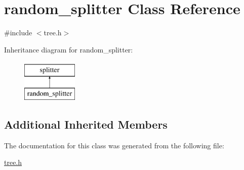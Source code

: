 \hypertarget{classrandom__splitter}{\section{random\+\_\+splitter Class Reference}
\label{classrandom__splitter}
}


{\ttfamily \#include $<$tree.\+h$>$}

Inheritance diagram for random\+\_\+splitter\+:\begin{figure}[H]
\begin{center}
\leavevmode
\includegraphics[height=2.000000cm]{classrandom__splitter}
\end{center}
\end{figure}
\subsection*{Additional Inherited Members}


The documentation for this class was generated from the following file\+:\begin{DoxyCompactItemize}
\item 
\hyperlink{tree_8h}{tree.\+h}\end{DoxyCompactItemize}
